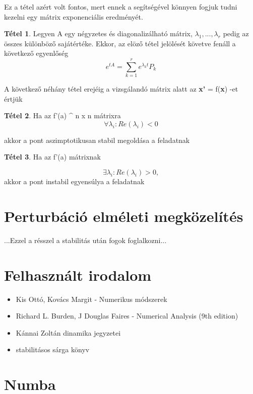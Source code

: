 \documentclass{article}
\theoremstyle{definition}
\theoremstyle{theorem}
\newtheorem{theorem}{Tétel}
\begin{document}
Ez a tétel azért volt fontos, mert ennek a segítségével könnyen fogjuk tudni kezelni egy mátrix exponenciális eredményét.

\begin{theorem}
Legyen A egy négyzetes és diagonalizálható mátrix, $\lambda_1,...,\lambda_r$ pedig az összes különböző sajátértéke. Ekkor, az elöző tétel jelölését követve fenáll a következő egyenlőség
\begin{equation*}
    e^{tA} = \sum_{k=1}^r e^{\lambda_k t} P_k
\end{equation*}
\end{theorem}
A következő néhány tétel erejéig a vizsgálandó mátrix alatt az \textbf{x'} = f(\textbf{x}) -et értjük
\begin{theorem}
Ha az f'(a) \in {} ^ {n x n} \;\;mátrixra \;\;
\begin{equation*}
    \forall \lambda_i : Re(\lambda_i) < 0
\end{equation*}

akkor a pont aszimptotikusan stabil megoldása a feladatnak
\end{theorem}

\begin{theorem}
Ha az f'(a) mátrixnak

\begin{equation*}
    \exists \lambda_i : Re(\lambda_i) > 0,
\end{equation*}
 akkor a pont instabil egyensúlya a feladatnak
\end{theorem}
\section{Perturbáció elméleti megközelítés}
...Ezzel a résszel a stabilitás után fogok foglalkozni...
\section{Felhasznált irodalom}
\begin{itemize}
    \item Kis Ottó, Kovács Margit - Numerikus módszerek
    \item Richard L. Burden, J Douglas Faires - Numerical Analysis (9th edition)
    \item Kánnai Zoltán dinamika jegyzetei
    \item stabilitásos sárga könyv
\end{itemize}
\section{Numba}
\end{document}
